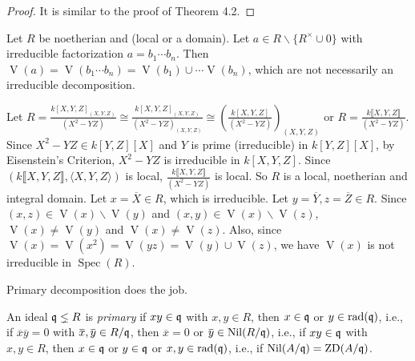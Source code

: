 \begin{proof}
    It is similar to the proof of Theorem 4.2.
\end{proof}

\begin{discussion}
    Let $R$ be noetherian and (local or a domain). Let $a \in R \smallsetminus \{R^{\times} \cup 0\}$ with irreducible factorization $a = b_1 \cdots b_n$. Then $\operatorname{V}(a) = \operatorname{V}(b_1 \cdots b_n) = \operatorname{V}(b_1) \cup \cdots \operatorname{V}(b_n)$, which are not necessarily an irreducible decomposition. 
\end{discussion}

\begin{example}
    Let $R = \frac{k[X,Y,Z]_{(X,Y,Z)}}{(X^{2}-YZ)} \cong \frac{k[X,Y,Z]_{(X,Y,Z)}}{(X^{2}-YZ)_{(X,Y,Z)}} \cong (\frac{k[X,Y,Z]}{(X^{2}-YZ)})_{(X,Y,Z)}$ or $R = \frac{k\llbracket X,Y,Z \rrbracket }{(X^{2}-YZ)}$. Since $X^{2}-YZ \in k[Y,Z][X]$ and $Y$ is prime (irreducible) in $k[Y,Z][X]$, by Eisenstein’s Criterion, $X^{2}-YZ$ is irreducible in $k[X,Y,Z]$. Since $(k\llbracket X,Y,Z \rrbracket,\langle X,Y,Z \rangle)$ is local, $\frac{k\llbracket X,Y,Z \rrbracket }{(X^{2}-YZ)}$ is local. So $R$ is a local, noetherian and integral domain. Let $x = \overbar{X} \in R$, which is irreducible. Let $y = \overline Y, z = \overline Z \in R$. Since $(x,z) \in \operatorname{V}(x) \smallsetminus \operatorname{V}(y)$ and $(x,y) \in \operatorname{V}(x) \smallsetminus \operatorname{V}(z)$, $\operatorname{V}(x) \neq \operatorname{V}(y)$ and $\operatorname{V}(x) \neq \operatorname{V}(z)$. Also, since $\operatorname{V}(x) = \operatorname{V}(x^{2}) = \operatorname{V}(yz) = \operatorname{V}(y) \cup \operatorname{V}(z)$, we have $\operatorname{V}(x)$ is not irreducible in $\operatorname{Spec}(R)$. 
\end{example}

\noindent Primary decomposition does the job.

\begin{definition}
    An ideal $\mathfrak{q} \lneq R$ is \emph{primary} if $xy \in \mathfrak{q}$ with $x,y \in R$, then $x \in \mathfrak{q}$ or $y \in \operatorname{rad}(\mathfrak{q})$, i.e., if $\overbar{x} \overbar{y} = 0$ with $\overbar{x}, \overbar{y} \in R/\ffq$, then $\overbar{x} = 0$ or $\overbar{y} \in \operatorname{Nil}(R/\ffq)$, i.e., if $xy \in \mathfrak{q}$ with $x,y \in R$, then $x \in \mathfrak{q}$ or $y \in \mathfrak{q}$ or $x,y \in \operatorname{rad}(\mathfrak{q})$, i.e., if $\operatorname{Nil}(A/\mathfrak{q}) = \operatorname{ZD}(A/\mathfrak{q})$.
\end{definition}

